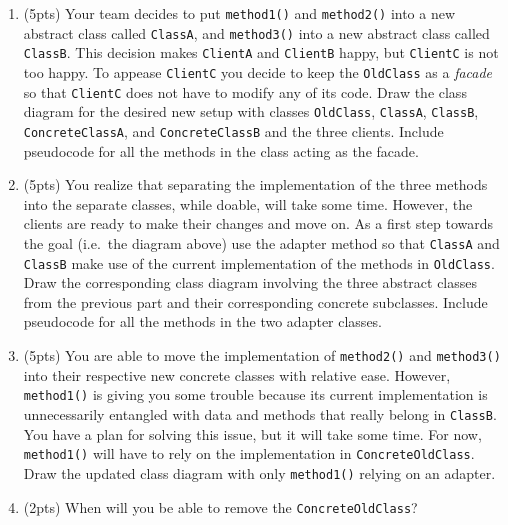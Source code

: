 \documentclass[11pt]{article}
\newlength{\up}\setlength{\up}{-\baselineskip}
\begin{document}
\begin{enumerate}
\begin{enumerate}
    \vspace{0.5in}

    \item (5pts) Your team decides to put \texttt{method1()} and \texttt{method2()} into a new abstract class called \texttt{ClassA}, and \texttt{method3()} into a new abstract class called \texttt{ClassB}. This decision makes \texttt{ClientA} and \texttt{ClientB} happy, but \texttt{ClientC} is not too happy. To appease \texttt{ClientC} you decide to keep the \texttt{OldClass} as a \emph{facade} so that \texttt{ClientC} does not have to modify any of its code. Draw the class diagram for the desired new setup with classes \texttt{OldClass}, \texttt{ClassA}, \texttt{ClassB}, \texttt{ConcreteClassA}, and \texttt{ConcreteClassB} and the three clients. Include pseudocode for all the methods in the class acting as the facade.

    \vfill

    \item (5pts) You realize that separating the implementation of the three methods into the separate classes, while doable, will take some time. However, the clients are ready to make their changes and move on. As a first step towards the goal (i.e.~the diagram above) use the adapter method so that \texttt{ClassA} and \texttt{ClassB} make use of the current implementation of the methods in \texttt{OldClass}. Draw the corresponding class diagram involving the three abstract classes from the previous part and their corresponding concrete subclasses. Include pseudocode for all the methods in the two adapter classes.

    \vfill

\newpage

    \item (5pts) You are able to move the implementation of \texttt{method2()} and \texttt{method3()} into their respective new concrete classes with relative ease. However, \texttt{method1()} is giving you some trouble because its current implementation is unnecessarily entangled with data and methods that really belong in \texttt{ClassB}. You have a plan for solving this issue, but it will take some time. For now, \texttt{method1()} will have to rely on the implementation in \texttt{ConcreteOldClass}. Draw the updated class diagram with only \texttt{method1()} relying on an adapter. 

    \vfill

    \item (2pts) When will you be able to remove the \texttt{ConcreteOldClass}?


\end{enumerate}
\end{enumerate}
\end{document}
